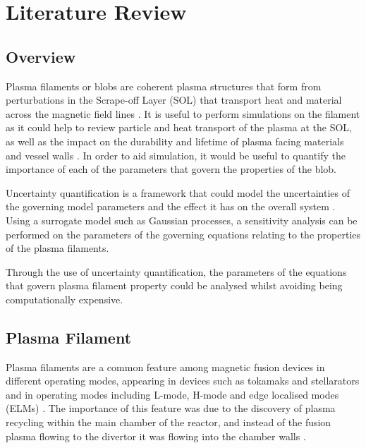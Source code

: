 \documentclass{article}
\begin{document}
\section*{Literature Review}
\subsection*{Overview}
Plasma filaments or blobs are coherent plasma structures that form from perturbations in the Scrape-off Layer (SOL) that transport heat and material across the magnetic field lines \cite{dippolito_convective_2011, hoare_dynamics_2019}. It is useful to perform simulations on the filament as it could help to review particle and heat transport of the plasma at the SOL, as well as the impact on the durability and lifetime of plasma facing materials and vessel walls \cite{carralero_experimental_2015, krasheninnikov_recent_2008}. In order to aid simulation, it would be useful to quantify the importance of each of the parameters that govern the properties of the blob.

Uncertainty quantification is a framework that could model the uncertainties of the governing model parameters and the effect it has on the overall system \cite{sudret_surrogate_2017}. Using a surrogate model such as Gaussian processes, a sensitivity analysis can be performed on the parameters of the governing equations relating to the properties of the plasma filaments.

Through the use of uncertainty quantification, the parameters of the equations that govern plasma filament property could be analysed whilst avoiding being computationally expensive. 
\subsection*{Plasma Filament}
Plasma filaments are a common feature among magnetic fusion devices in different operating modes, appearing in devices such as tokamaks and stellarators and in operating modes including L-mode, H-mode and edge localised modes (ELMs) \cite{ben_ayed_inter-elm_2009, killer_plasma_2020, boedo_transport_2003}. The importance of this feature was due to the discovery of plasma recycling within the main chamber of the reactor, and instead of the fusion plasma flowing to the divertor it was flowing into the chamber walls \cite{krasheninnikov_recent_2008,dippolito_convective_2011}.
\end{document}
